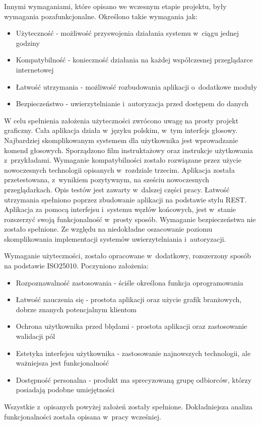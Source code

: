Innymi wymaganiami, które opisano we wczesnym etapie projektu, były wymagania pozafunkcjonalne. Określono takie wymagania jak:
\begin{itemize}
    \item Użyteczność - możliwość przyswojenia działania systemu w~ciągu jednej godziny
    \item Kompatybilność - konieczność działania na każdej współczesnej przeglądarce internetowej
    \item Łatwość utrzymania - możliwość rozbudowania aplikacji o~dodatkowe moduły
    \item Bezpieczeństwo - uwierzytelnianie i~autoryzacja przed dostępem do danych
\end{itemize} 
W celu spełnienia założenia użyteczności zwrócono uwagę na prosty projekt graficzny. Cała aplikacja działa w~języku polskim, w~tym interfejs głosowy. Najbardziej skomplikowanym systemem dla użytkownika jest wprowadzanie komend głosowych. Sporządzono film instruktażowy oraz instrukcje użytkowania z~przykładami. Wymaganie kompatybilności zostało rozwiązane przez użycie nowoczesnych technologii opisanych w~rozdziale trzecim. Aplikacja została przetestowana, z~wynikiem pozytywnym, na sześciu nowoczesnych przeglądarkach. Opis testów jest zawarty w~dalszej części pracy. Łatwość utrzymania spełniono poprzez zbudowanie aplikacji na podstawie stylu REST. Aplikacja za pomocą interfejsu i~systemu węzłów końcowych, jest w~stanie rozszerzyć swoją funkcjonalność w~prosty sposób. Wymaganie bezpieczeństwa nie zostało spełnione. Ze względu na niedokładne oszacowanie poziomu skomplikowania implementacji systemów uwierzytelniania i~autoryzacji.

Wymaganie użyteczności, zostało opracowane w~dodatkowy, rozszerzony sposób na podstawie ISO25010. Poczyniono założenia:
\begin{itemize}
    \item Rozpoznawalność zastosowania - ściśle określona funkcja oprogramowania
    \item Łatwość nauczenia się - prostota aplikacji oraz użycie grafik branżowych, dobrze znanych potencjalnym klientom
    \item Ochrona użytkownika przed błędami - prostota aplikacji oraz zastosowanie walidacji pól
    \item Estetyka interfejsu użytkownika - zastosowanie najnowszych technologii, ale ważniejsza jest funkcjonalność
    \item Dostępność personalna - produkt ma sprecyzowaną grupę odbiorców, którzy posiadają podobne umiejętności
\end{itemize} 
Wszystkie z~opisanych powyżej założeń zostały spełnione. Dokładniejsza analiza funkcjonalności została opisana w~pracy wcześniej.


